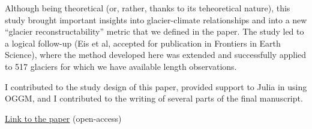 Although being theoretical (or, rather, thanks to its teheoretical nature),
this study brought important insights into
glacier-climate relationships and into a new “glacier reconstructability” metric that
we defined in the paper. The study led to a logical follow-up (Eis et al, accepted
for publication in Frontiers in Earth Science), where the method developed here
was extended and successfully applied to 517 glaciers for which we have available length
observations.

I contributed to the study design of this paper, provided support to Julia in using
OGGM, and I contributed to the writing of several parts of the final manuscript.

\href{https://doi.org/10.5194/tc-13-3317-2019}{Link to the paper} (open-access)


\iflong  \else \fi 

